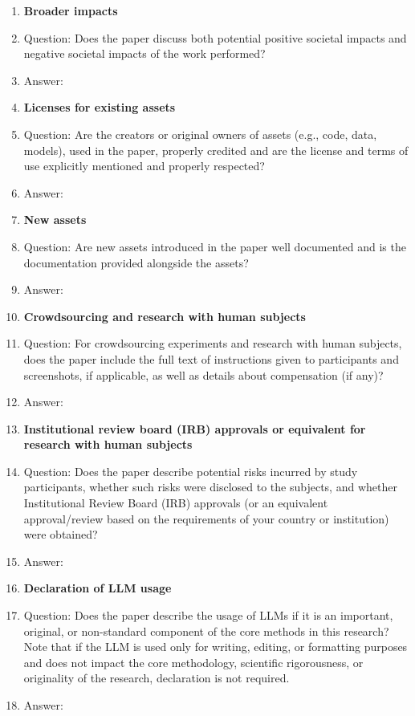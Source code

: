 \documentclass{article}
\begin{document}
\begin{enumerate}
\item {\bf Broader impacts}
    \item[] Question: Does the paper discuss both potential positive societal impacts and negative societal impacts of the work performed?
    \item[] Answer: \answerNA{} %
      
\item {\bf Licenses for existing assets}
    \item[] Question: Are the creators or original owners of assets (e.g., code, data, models), used in the paper, properly credited and are the license and terms of use explicitly mentioned and properly respected?
    \item[] Answer: \answerNA{} %

\item {\bf New assets}
    \item[] Question: Are new assets introduced in the paper well documented and is the documentation provided alongside the assets?
    \item[] Answer: \answerNA{} %

\item {\bf Crowdsourcing and research with human subjects}
    \item[] Question: For crowdsourcing experiments and research with human subjects, does the paper include the full text of instructions given to participants and screenshots, if applicable, as well as details about compensation (if any)?
    \item[] Answer: \answerNA{} %

\item {\bf Institutional review board (IRB) approvals or equivalent for research with human subjects}
    \item[] Question: Does the paper describe potential risks incurred by study participants, whether such risks were disclosed to the subjects, and whether Institutional Review Board (IRB) approvals (or an equivalent approval/review based on the requirements of your country or institution) were obtained?
    \item[] Answer: \answerNA{} %

\item {\bf Declaration of LLM usage}
    \item[] Question: Does the paper describe the usage of LLMs if it is an important, original, or non-standard component of the core methods in this research? Note that if the LLM is used only for writing, editing, or formatting purposes and does not impact the core methodology, scientific rigorousness, or originality of the research, declaration is not required.
    \item[] Answer: \answerNA{} %
\end{enumerate}
\end{document}
